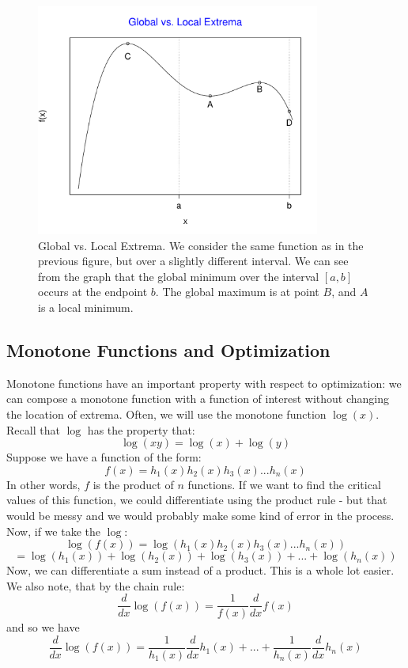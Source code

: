 \documentclass[12pt,a4paper]{article} %
\begin{document}
\begin{figure}[H]
\includegraphics[height=3in]{extrema2.pdf}
\caption{Global vs. Local Extrema.  We consider the same function as in the previous figure, but over a slightly different interval.  We can see from the graph that the global minimum over the interval $[a,b]$ occurs at the endpoint $b$.  The global maximum is at point $B$, and $A$ is a local minimum.}
\end{figure} 
\newpage
\subsection{Monotone Functions and Optimization}
Monotone functions have an important property with respect to optimization: we can compose a monotone function with a function of interest without changing the location of extrema.  Often, we will use the monotone function $\log(x)$. Recall that $\log$ has the property that:
$$\log(xy) = \log(x) + \log(y)$$
Suppose we have a function of the form:
$$f(x) = h_1(x)h_2(x)h_3(x)...h_n(x)$$
In other words, $f$ is the product of $n$ functions.  If we want to find the critical values of this function, we could differentiate using the product rule - but that would be messy and we would probably make some kind of error in the process.  Now, if we take the $\log$:
$$\log(f(x)) = \log(h_1(x)h_2(x)h_3(x)...h_n(x))$$
$$= \log(h_1(x))+ \log(h_2(x))+\log(h_3(x))+...+\log(h_n(x))$$
Now, we can differentiate a sum instead of a product.  This is a whole lot easier.  We also note, that by the chain rule:
$$\frac{d}{dx}\log(f(x)) = \frac{1}{f(x)}\frac{d}{dx}f(x)$$
and so we have
$$\frac{d}{dx}\log(f(x)) = \frac{1}{h_1(x)}\frac{d}{dx}h_1(x)+...+\frac{1}{h_n(x)}\frac{d}{dx}h_n(x)$$
\end{document}
